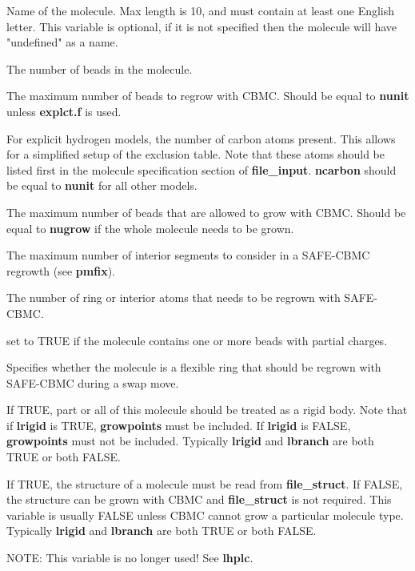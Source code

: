 \documentclass[12pt,letterpaper]{article}
\begin{document}
 Name of the molecule. Max length
is 10, and must contain at least one English letter. This
variable is optional, if it is not specified then the molecule
will have "undefined" as a name.

 The number of beads in the molecule.

 The maximum number of beads to regrow
with CBMC. Should be equal to {\bf nunit} unless {\bf
  explct.f} is used.

 For explicit hydrogen models, the
number of carbon atoms present. This allows for a simplified
setup of the exclusion table. Note that these atoms should
be listed first in the molecule specification section of
{\bf file\_input}. {\bf ncarbon} should be equal to {\bf
  nunit} for all other models.

 The maximum number of beads that are
allowed to grow with CBMC. Should be equal to {\bf nugrow}
if the whole molecule needs to be grown.

 The maximum number of interior
segments to consider in a SAFE-CBMC regrowth (see {\bf
  pmfix}).

 The number of ring or interior atoms 
that needs to be regrown with SAFE-CBMC.

 set to TRUE if the molecule contains
one or more beads with partial charges.

 Specifies whether the molecule is a
flexible ring that should be regrown with SAFE-CBMC during a
swap move.

 If TRUE, part or all of this molecule
should be treated as a rigid body. Note that if {\bf lrigid}
is TRUE, {\bf growpoints} must be included. If {\bf lrigid}
is FALSE, {\bf growpoints} must not be included. Typically
{\bf lrigid} and {\bf lbranch} are both TRUE or both FALSE.

 If TRUE, the structure of a molecule
must be read from {\bf file\_struct}. If FALSE, the
structure can be grown with CBMC and {\bf file\_struct} is
not required. This variable is usually FALSE unless CBMC
cannot grow a particular molecule type. Typically {\bf
  lrigid} and {\bf lbranch} are both TRUE or both FALSE.

 NOTE: This variable is no longer used! See {\bf lhplc}.

\end{document}
